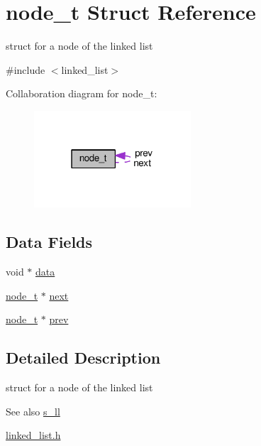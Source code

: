 \hypertarget{structs__ll__node}{}\section{node\+\_\+t Struct Reference}
\label{structs__ll__node}


struct for a node of the linked list  




{\ttfamily \#include $<$linked\+\_\+list$>$}



Collaboration diagram for node\+\_\+t\+:\nopagebreak
\begin{figure}[H]
\begin{center}
\leavevmode
\includegraphics[width=166pt]{structs__ll__node__coll__graph}
\end{center}
\end{figure}
\subsection*{Data Fields}
\begin{DoxyCompactItemize}
\item 
void $\ast$ \hyperlink{structs__ll__node_aa69340d9d81a183ddfbfec74a7524966}{data}
\item 
\hyperlink{structnode__t}{node\+\_\+t} $\ast$ \hyperlink{structs__ll__node_a3eaaa938f4adef906b28c0afcaf511d6}{next}
\item 
\hyperlink{structnode__t}{node\+\_\+t} $\ast$ \hyperlink{structs__ll__node_a19e812d499f3cd75491d7ab5b1d08e6c}{prev}
\end{DoxyCompactItemize}


\subsection{Detailed Description}
struct for a node of the linked list 

\begin{DoxySeeAlso}{See also}
\hyperlink{structs__ll}{s\+\_\+ll} 

\hyperlink{linked__list_8h}{linked\+\_\+list.\+h} 
\end{DoxySeeAlso}


